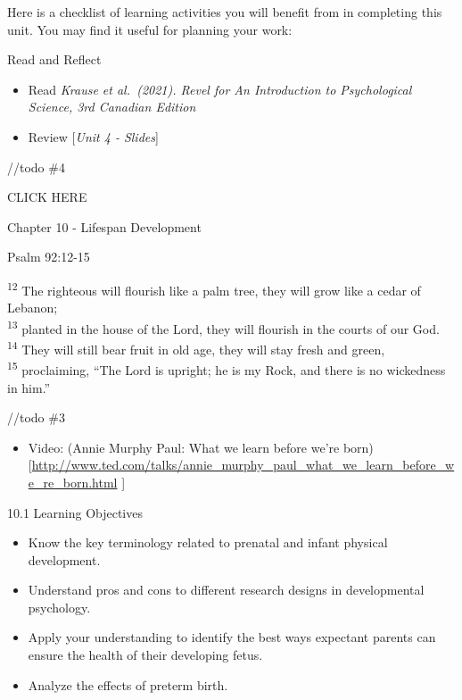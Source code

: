 \documentclass[
]{book}
\providecommand{\tightlist}{%
  \setlength{\itemsep}{0pt}\setlength{\parskip}{0pt}}
\begin{document}
Here is a checklist of learning activities you will benefit from in completing this unit. You may find it useful for planning your work:

\begin{reflect}
{Read and Reflect}

\begin{itemize}
\tightlist
\item
  Read \emph{Krause et al.~(2021). Revel for An Introduction to Psychological Science, 3rd Canadian Edition}\\
\item
  Review {[}\emph{Unit 4 - Slides}{]}
\end{itemize}

//todo \#4

CLICK HERE

Chapter 10 - Lifespan Development

Psalm 92:12-15

\textsuperscript{12} The righteous will flourish like a palm tree, they will grow like a cedar of Lebanon;\\
\textsuperscript{13} planted in the house of the Lord, they will flourish in the courts of our God.\\
\textsuperscript{14} They will still bear fruit in old age, they will stay fresh and green,\\
\textsuperscript{15} proclaiming, ``The Lord is upright; he is my Rock, and there is no wickedness in him.''

//todo \#3

\begin{itemize}
\tightlist
\item
  Video: (Annie Murphy Paul: What we learn before we're born){[}\url{http://www.ted.com/talks/annie_murphy_paul_what_we_learn_before_we_re_born.html} {]}
\end{itemize}

10.1 Learning Objectives

\begin{itemize}
\tightlist
\item
  Know the key terminology related to prenatal and infant physical development.\\
\item
  Understand pros and cons to different research designs in developmental psychology.\\
\item
  Apply your understanding to identify the best ways expectant parents can ensure the health of their developing fetus.\\
\item
  Analyze the effects of preterm birth.
\end{itemize}


\end{reflect}
\end{document}
